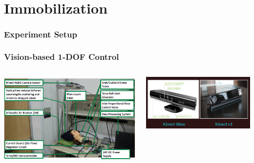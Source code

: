 \section{Immobilization}
\begin{frame}
\subsubsection{Experiment Setup}
\frametitle{Vision-based 1-DOF Control}
\begin{columns}[c]
	\begin{column}{0.6\textwidth}
		\includegraphics[width=\linewidth,height=.8\linewidth]{figures/setup_1dof.png}
	\end{column}
	\begin{column}{0.48\linewidth}
		\includegraphics[width=\linewidth]{figures/kinects.png}
	\end{column}
\end{columns}
\end{frame}
%

